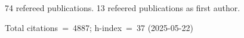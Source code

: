 74 refereed publications. 13 refeered publications as first author.

Total citations~=~4887; h-index~=~37 (2025-05-22)